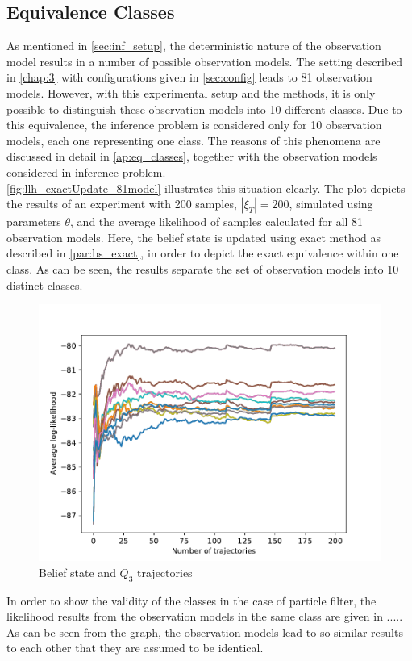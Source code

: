 \subsection{Equivalence Classes}
\label{sec:eq_classes}
As mentioned in \cref{sec:inf_setup}, the deterministic nature of the observation model results in a number of possible observation models. The setting described in \cref{chap:3} with configurations given in \cref{sec:config} leads to 81 observation models. However, with this experimental setup and the methods, it is only possible to distinguish these observation models into 10 different classes. Due to this equivalence, the inference problem is considered only for 10 observation models, each one representing one class. The reasons of this phenomena are discussed in detail in \cref{ap:eq_classes}, together with the observation models considered in inference problem. \\
\autoref{fig:llh_exactUpdate_81model} illustrates this situation clearly. The plot depicts the results of an experiment with 200 samples, $ |\xi_T| = 200 $, simulated using parameters $ \theta $, and the average likelihood of samples calculated for all 81 observation models. Here, the belief state is updated using exact method as described in \cref{par:bs_exact}, in order to depict the exact equivalence within one class. As can be seen, the results separate the set of observation models into 10 distinct classes.
\begin{figure}[H]
	\begin{center}
		\includegraphics[width=.60\textwidth]{figures/equivalence_classes/llh_exactUpdate_81model}
		\caption{Belief state and $ Q_3 $ trajectories}
		\label{fig:llh_exactUpdate_81model}
	\end{center}
\end{figure}
In order to show the validity of the classes in the case of particle filter, the likelihood results from the observation models in the same class are given in ..... As can be seen from the graph, the observation models lead to so similar results to each other that they are assumed to be identical. 

